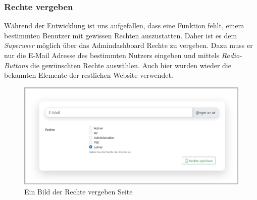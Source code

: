 \newpage 
\subsubsection{Rechte vergeben}
\label{chapter:implementierung-frontend-komponenten-rechte}
Während der Entwicklung ist uns aufgefallen, dass eine Funktion fehlt, einem bestimmten Benutzer mit gewissen Rechten auszustatten. Daher ist es dem \textit{Superuser} möglich über das Admindashboard Rechte zu vergeben. Dazu muss er nur die E-Mail Adresse des bestimmten Nutzers eingeben und mittels \textit{Radio-Buttons} die gewünschten Rechte auswählen. Auch hier wurden wieder die bekannten Elemente der restlichen Website verwendet.
\begin{figure}[H]
	\centering
	\includegraphics[width=1\linewidth]{images/website/rechte}
	\caption[Neuer Schulantrag]{Ein Bild der Rechte vergeben Seite}
	\label{fig:rightssite}
\end{figure}